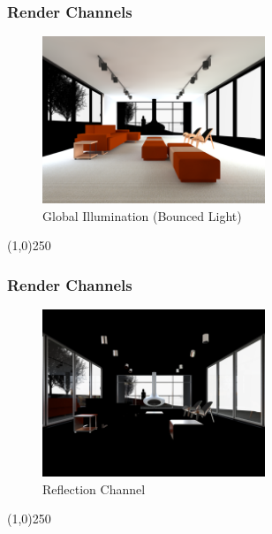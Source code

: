 \begin{frame}
\frametitle{Render Channels}
\begin{figure}
	\centering
	\includegraphics[height=5cm]{./img/Rendering/SittingRoomFinalGlobal_Illumination.png}
	\caption[Global Illumination (Bounced Light)]{Global Illumination (Bounced Light)}
	\label{fig:sittingroomfinalGlobalIllumination}
\end{figure}
\end{frame}
\begin{center}\line(1,0){250}\end{center}







\begin{frame}
\frametitle{Render Channels}
\begin{figure}
	\centering
	\includegraphics[height=5cm]{./img/Rendering/SittingRoomFinalReflection}
	\caption[Reflection Channel]{Reflection Channel}
	\label{fig:sittingroomfinalReflection}
\end{figure}
\end{frame}
\begin{center}\line(1,0){250}\end{center}

